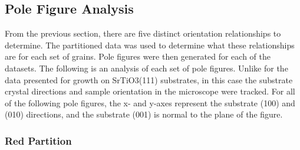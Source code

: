 \documentclass[12pt,%
              twoside,
               letterpaper]{uiothesis}
\begin{document}
\subsection{Pole Figure Analysis}
\label{subsec:single.growth.polefigureanalysis}


From the previous section, there are five distinct orientation relationships to determine.
The partitioned data was used to determine what these relationships are for each set of
grains. Pole figures were then generated for each of the datasets. The following is an
analysis of each set of pole figures. Unlike for the data presented for growth on
SrTiO3(111) substrates, in this case the substrate crystal directions and sample
orientation in the microscope were tracked. For all of the following pole figures, the x-
and y-axes represent the substrate (100) and (010) directions, and the substrate (001) is
normal to the plane of the figure.


\subsubsection{Red Partition}
\label{subsubsec:single.growth.red}
\end{document}
